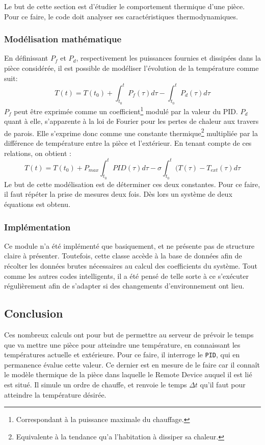\documentclass[11pt,a4paper,11pt]{report}
\begin{document}
Le but de cette section est d'étudier le comportement thermique d'une pièce. Pour ce faire, le code doit analyser ses caractéristiques thermodynamiques.

\subsubsection{Modélisation mathématique}
En définissant $P_f$ et $P_d$, respectivement les puissances fournies et dissipées dans la pièce considérée, il est possible de modéliser l'évolution de la température comme suit:
\begin{equation}
T(t) = T(t_0) + \int_{t_0}^{t} P_{f}(\tau) d\tau - \int_{t_0}^{t} P_{d}(\tau) d\tau
\end{equation}
$P_f$ peut être exprimée comme un coefficient\footnote{Correspondant à la puissance maximale du chauffage.} modulé par la valeur du PID. $P_d$ quant à elle, s'apparente à la loi de Fourier pour les pertes de chaleur aux travers de parois\cite{haelti}. Elle s'exprime donc comme une constante thermique\footnote{Equivalente à la tendance qu'a l'habitation à dissiper sa chaleur.} multipliée par la différence de température entre la pièce et l'extérieur. En tenant compte de ces relations, on obtient :
\begin{equation}
\label{thermo}
T(t) = T(t_0) + P_{max}\int_{t_0}^{t} PID(\tau) d\tau - \sigma \int_{t_0}^{t} (T(\tau) - T_{ext}(\tau) d\tau
\end{equation}
Le but de cette modélisation est de déterminer ces deux constantes. Pour ce faire, il faut répéter la prise de mesures deux fois. Dès lors un système de deux équations est obtenu.\\

\subsubsection{Implémentation}

Ce module n'a été implémenté que basiquement, et ne présente pas de structure claire à présenter. Toutefois, cette classe accède à la base de données afin de récolter les données brutes nécessaires au calcul des coefficients du système. Tout comme les autres codes intelligents, il a été pensé de telle sorte à ce s'exécuter régulièrement afin de s'adapter si des changements d'environnement ont lieu.
\subsection{Conclusion}
Ces nombreux calculs ont pour but de permettre au serveur de prévoir le temps que va mettre une pièce pour atteindre une température, en connaissant les températures actuelle et extérieure. Pour ce faire, il interroge le \texttt{PID}, qui en permanence évalue cette valeur. Ce dernier est en mesure de le faire car il connaît le modèle thermique de la pièce dans laquelle le Remote Device auquel il est lié est situé. Il simule un ordre de chauffe, et renvoie le temps $\Delta t$ qu'il faut pour atteindre la température désirée.\\
\end{document}
